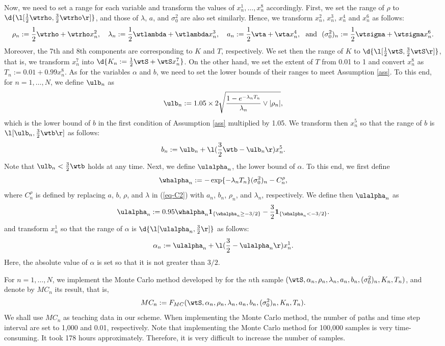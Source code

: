 Now, we need to set a range for each variable and transform the values of $x^1_n,\dots,x^8_n$ accordingly.
First, we set the range of $\rho$ to $\d{\l[\frac{1}{2}\wtrho,\frac{3}{2}\wtrho\r]}$, and those of $\lambda$, $a$, and $\sigma_0^2$ are also set similarly.
Hence, we transform $x^2_n$, $x^3_n$, $x^4_n$ and $x^6_n$ as follows: 
\[
\rho_n         := \frac{1}{2}\wtrho    +\wtrho x^2_n,    \ \ \ 
\lambda_n      := \frac{1}{2}\wtlambda +\wtlambda x^3_n, \ \ \ 
a_n            := \frac{1}{2}\wta      +\wta x^4_n,      \ \mbox{ and } \ 
(\sigma^2_0)_n := \frac{1}{2}\wtsigma  +\wtsigma x^6_n.
\]
Moreover, the 7th and 8th components are corresponding to $K$ and $T$, respectively.
We set then the range of $K$ to $\d{\l[\frac{1}{2}\wtS,\frac{3}{2}\wtS\r]}$, that is, we transform $x^7_n$ into $\d{K_n:=\frac{1}{2}\wtS+\wtS x^7_n}$.
On the other hand, we set the extent of $T$ from 0.01 to 1 and convert $x^8_n$ as $T_n:=0.01+0.99x^8_n$.
As for the variables $\alpha$ and $b$, we need to set the lower bounds of their ranges to meet Assumption \ref{ass}.
To this end, for $n=1,\dots,N$, we define $\ulb_n$ as
\[
\ulb_n:=1.05\times2\sqrt{\frac{1-e^{-\lambda_nT_n}}{\lambda_n}\vee|\rho_n|},
\]
which is the lower bound of $b$ in the first condition of Assumption \ref{ass} multiplied by 1.05.
We transform then $x^5_n$ so that the range of $b$ is $\l[\ulb_n,\frac{3}{2}\wtb\r]$ as follows:
\[
b_n := \ulb_n +\l(\frac{3}{2}\wtb-\ulb_n\r)x^5_n.
\]
Note that $\ulb_n<\frac{3}{2}\wtb$ holds at any time.
Next, we define $\ulalpha_n$, the lower bound of $\alpha$. To this end, we first define
\[
\whalpha_n := -\exp\{-\lambda_nT_n\}(\sigma^2_0)_n-C^\rho_n,
\]
where $C^\rho_n$ is defined by replacing $a$, $b$, $\rho$, and $\lambda$ in (\ref{eq-C2}) with $a_n$, $b_n$, $\rho_n$, and $\lambda_n$, respectively.
We define then $\ulalpha_n$ as
\[
\ulalpha_n := 0.95\whalpha_n{\bf 1}_{\{\whalpha_n\geq-3/2\}}-\frac{3}{2}{\bf 1}_{\{\whalpha_n<-3/2\}}.
\]
and transform $x^1_n$ so that the range of $\alpha$ is $\d{\l[\ulalpha_n,\frac{3}{2}\r]}$ as follows:
\[
\alpha_n := \ulalpha_n+\l(\frac{3}{2}-\ulalpha_n\r)x^1_n.
\]
Here, the absolute value of $\alpha$ is set so that it is not greater than $3/2$.

For $n=1,\dots,N$, we implement the Monte Carlo method developed by \cite{AI}
for the $n$th sample $(\wtS,\alpha_n,\rho_n,\lambda_n,a_n,b_n,(\sigma_0^2)_n,K_n,T_n)$, and denote by $MC_n$ its result, that is,
\[
MC_n := F_{MC}(\wtS,\alpha_n,\rho_n,\lambda_n,a_n,b_n,(\sigma_0^2)_n,K_n,T_n).
\]
We shall use $MC_n$ as teaching data in our scheme.
When implementing the Monte Carlo method, the number of paths and time step interval are set to 1,000 and 0.01, respectively.
Note that implementing the Monte Carlo method for 100,000 samples is very time-consuming.
It took 178 hours approximately. Therefore, it is very difficult to increase the number of samples.

